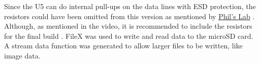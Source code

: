 Since the U5 can do internal pull-ups on the data lines with ESD protection, the resistors could have been omitted from this version as mentioned by \href{https://www.youtube.com/watch?v=aEwwQMdKd-c\&t=248s}{Phil's Lab} \cite{phils-lab-sd}. Although, as mentioned in the video, it is recommended to include the resistors for the final build \cite{phils-lab-sd}.
\nl
FileX was used to write and read data to the microSD card. A stream data function was generated to allow larger files to be written, like image data.